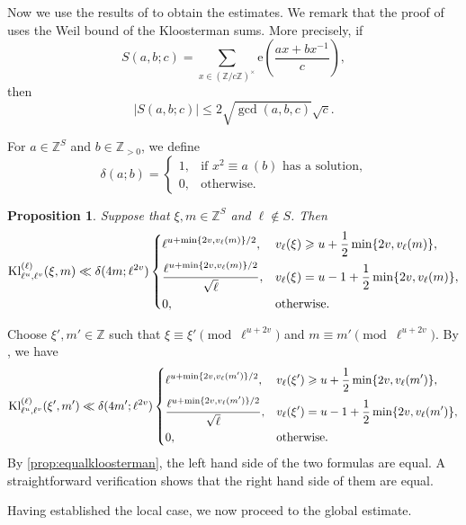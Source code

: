 \documentclass[10pt,oneside,reqno]{amsart}
\makeatletter
\newcommand\rme{\mathrm{e}}
\newcommand\ZZ{\mathbb{Z}}
\newcommand\Kl{\mathrm{Kl}}
\renewcommand\leq{\leqslant}
\renewcommand\geq{\geqslant}
\newcommand\legendresymbol[2]{\genfrac{(}{)}{}{}{#1}{#2}}
\theoremstyle{THEOREM}
\newtheorem{proposition}[theorem]{Proposition}
\theoremstyle{DEFINITION}
\theoremstyle{EXERCISE}
\numberwithin{equation}{section}
\renewenvironment{proof}[1][\proofname]{\par
  \vspace{-6pt}
  \pushQED{\qed}
  \normalfont \topsep6\p@\@plus6\p@\relax
  \trivlist
  \item[\hskip\labelsep\rmfamily\bfseries
    #1\@addpunct{:}]\ignorespaces
}{
  \popQED\endtrivlist\@endpefalse
  \vspace{-6pt}
}
\makeatother
\begin{document}
Now we use the results of \cite[Appendix B]{altug2017} to obtain the estimates. We remark that the proof of \cite[Appendix B]{altug2017} uses the Weil bound \cite{weil1948} of the Kloosterman sums. More precisely, if
\[
S(a,b;c)=\sum_{x\in (\ZZ/c\ZZ)^\times}\rme\legendresymbol{ax+bx^{-1}}{c},
\]
then 
\[
|S(a,b;c)|\leq 2\sqrt{\gcd(a,b,c)}\sqrt{c}.
\]

For $a\in \ZZ^S$ and $b\in \ZZ_{>0}$, we define
\[
\delta(a;b)=\begin{cases}
              1, & \text{if $x^2\equiv a\ (b)$ has a solution,}  \\
              0, & \text{otherwise}.
            \end{cases}
\]

\begin{proposition}\label{prop:kloostermanunramified}
Suppose that $\xi,m\in \ZZ^S$ and $\ell\notin S$. Then
\[
\Kl_{\ell^u,\ell^v}^{(\ell)}(\xi,m)\ll\delta(4m;\ell^{2v})\begin{dcases}
             \ell^{u+\min\{2v,v_{\ell}(m)\}/2}, & v_\ell(\xi)\geq u+\frac{1}{2}\min\{2v,v_{\ell}(m)\},  \\
              \frac{\ell^{u+\min\{2v,v_{\ell}(m)\}/2}}{\sqrt{\ell}}, & v_\ell(\xi)= u-1+\frac{1}{2}\min\{2v,v_{\ell}(m)\},  \\
              0, & \text{otherwise}.
            \end{dcases}
\]
\end{proposition}
\begin{proof}
Choose $\xi',m'\in \ZZ$ such that $\xi\equiv \xi'\pmod {\ell^{u+2v}}$ and $m\equiv m'\pmod {\ell^{u+2v}}$. By \cite[Corllary B.6]{altug2017}, we have
\[
\Kl_{\ell^u,\ell^v}^{(\ell)}(\xi',m')\ll\delta(4m';\ell^{2v})\begin{dcases}
              \ell^{u+\min\{2v,v_{\ell}(m')\}/2}, & v_\ell(\xi')\geq u+\frac{1}{2}\min\{2v,v_{\ell}(m')\},  \\
              \frac{\ell^{u+\min\{2v,v_{\ell}(m')\}/2}}{\sqrt{\ell}}, & v_\ell(\xi')= u-1+\frac{1}{2}\min\{2v,v_{\ell}(m')\},  \\
              0, & \text{otherwise}.
            \end{dcases}
\]
By \autoref{prop:equalkloosterman}, the left hand side of the two formulas are equal. A straightforward verification shows that the right hand side of them are equal.
\end{proof}

Having established the local case, we now proceed to the global estimate.
\end{document}
